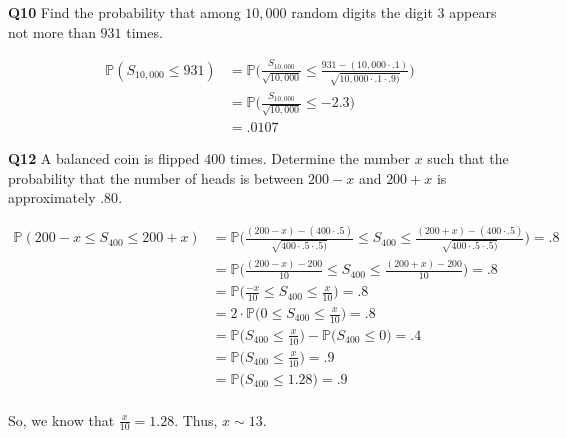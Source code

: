 \documentclass[12pt]{article}
\begin{document}
\noindent
\textbf{Q10} Find the probability that among $10,000$ random digits the digit $3$ appears not more than $931$ times.

\begin{align*}
\mathbb{P}(S_{10,000} \leq 931) &= \mathbb{P}\Bigg ( \frac{S_{10,000}}{\sqrt{10,000}} \leq \frac{931 - (10,000 \cdot .1)}{\sqrt{10,000 \cdot .1 \cdot .9)}} \Bigg ) \\
&= \mathbb{P}\Bigg ( \frac{S_{10,000}}{\sqrt{10,000}} \leq -2.3 \Bigg ) \\
&=  .0107
\end{align*}


\noindent
\textbf{Q12} A balanced coin is flipped $400$ times. Determine the number $x$ such that the probability that the number of heads is between $200 - x$ and $200 + x$ is  approximately $.80$.

\begin{align*}
\mathbb{P}( 200 - x \leq S_{400} \leq 200 + x) &= \mathbb{P}\Bigg ( \frac{(200 - x) - (400 \cdot .5)}{\sqrt{400 \cdot .5 \cdot .5)}} \leq S_{400} \leq \frac{(200 + x) - (400 \cdot .5)}{\sqrt{400 \cdot .5 \cdot .5)}} \Bigg ) = .8 \\
&= \mathbb{P}\Bigg ( \frac{(200 - x) - 200}{10} \leq S_{400} \leq \frac{(200 + x) - 200}{10} \Bigg ) = .8 \\
&= \mathbb{P}\Bigg ( \frac{-x}{10} \leq S_{400} \leq \frac{x}{10} \Bigg ) = .8 \\
&= 2 \cdot \mathbb{P}\Bigg ( 0 \leq S_{400} \leq \frac{x}{10} \Bigg ) = .8 \\
&= \mathbb{P}\Bigg (S_{400} \leq \frac{x}{10} \Bigg ) - \mathbb{P}\Bigg (S_{400} \leq 0 \Bigg ) = .4 \\
&= \mathbb{P}\Bigg (S_{400} \leq \frac{x}{10} \Bigg ) = .9 \\
&= \mathbb{P}\Bigg (S_{400} \leq 1.28 \Bigg ) = .9 \\
\end{align*}

\noindent
So, we know that $\frac{x}{10} = 1.28$. Thus, $x \sim 13$.
\end{document}
